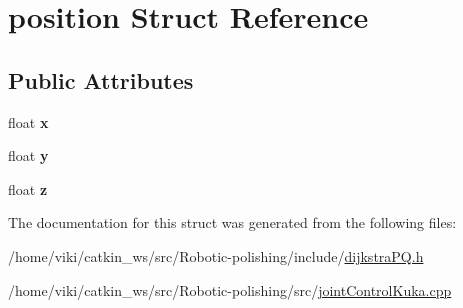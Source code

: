 \hypertarget{structposition}{}\section{position Struct Reference}
\label{structposition}
\subsection*{Public Attributes}
\begin{DoxyCompactItemize}
\item 
float {\bfseries x}\hypertarget{structposition_a0019a0a4cc8203a3f24a6f32566bbbd1}{}\label{structposition_a0019a0a4cc8203a3f24a6f32566bbbd1}

\item 
float {\bfseries y}\hypertarget{structposition_a1e0761bc9863e892ba24261551655313}{}\label{structposition_a1e0761bc9863e892ba24261551655313}

\item 
float {\bfseries z}\hypertarget{structposition_a9f6e4f705facb726a89fa289d20daf1a}{}\label{structposition_a9f6e4f705facb726a89fa289d20daf1a}

\end{DoxyCompactItemize}


The documentation for this struct was generated from the following files\+:\begin{DoxyCompactItemize}
\item 
/home/viki/catkin\+\_\+ws/src/\+Robotic-\/polishing/include/\hyperlink{dijkstraPQ_8h}{dijkstra\+P\+Q.\+h}\item 
/home/viki/catkin\+\_\+ws/src/\+Robotic-\/polishing/src/\hyperlink{jointControlKuka_8cpp}{joint\+Control\+Kuka.\+cpp}\end{DoxyCompactItemize}

